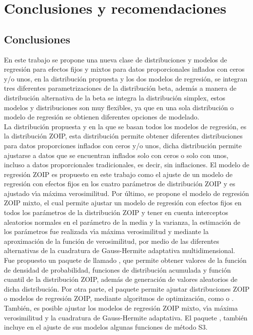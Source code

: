 \chapter{Conclusiones y recomendaciones}\label{cap5}
\section{Conclusiones}

En este trabajo se propone una nueva clase de distribuciones y modelos de regresi\'{o}n para efectos fijos y mixtos para datos proporcionales inflados con ceros y/o unos, en la distribuci\'{o}n propuesta y los dos modelos de regresi\'{o}n, se integran tres diferentes parametrizaciones de la distribuci\'{o}n beta, adem\'{a}s a manera de distribuci\'{o}n alternativa de la beta se integra la distribuci\'{o}n simplex, estos modelos y distribuciones son muy flexibles, ya que en una sola distribuci\'{o}n o modelo de regresi\'{o}n se obtienen diferentes opciones de modelado.\\

La distribuci\'{o}n propuesta y en la que se basan todos los modelos de regresi\'{o}n, es la distribuci\'{o}n ZOIP, esta distribuci\'{o}n permite obtener diferentes distribuciones para datos proporciones inflados con ceros y/o unos, dicha distribuci\'{o}n permite ajustarse a datos que se encuentran inflados solo con ceros o solo con unos, incluso a datos proporcionales tradicionales, es decir, sin inflaciones. El modelo de regresi\'{o}n ZOIP es propuesto en este trabajo como el ajuste de un modelo de regresi\'{o}n con efectos fijos en los cuatro par\'{a}metros de distribuci\'{o}n ZOIP y es ajustado v\'{\i}a m\'{a}xima verosimilitud. Por \'{u}ltimo, se propone el modelo de regresi\'{o}n ZOIP mixto, el cual permite ajustar un modelo de regresi\'{o}n con efectos fijos en todos los par\'{a}metros de la distribuci\'{o}n ZOIP y tener en cuenta interceptos aleatorios normales en el par\'{a}metro de la media y la varianza, la estimaci\'{o}n de los par\'{a}metros fue realizada v\'{\i}a m\'{a}xima verosimilitud y mediante la aproximaci\'{o}n de la funci\'{o}n de verosimilitud, por medio de las diferentes alternativas de la cuadratura de Gauss-Hermite adaptativa multidimensional.\\
 
Fue propuesto un paquete de  llamado , que permite obtener valores de la funci\'{o}n de densidad de probabilidad, funciones de distribuci\'{o}n acumulada y funci\'{o}n cuantil de la distribuci\'{o}n ZOIP, adem\'{a}s de generaci\'{o}n de valores aleatorios de dicha distribuci\'{o}n. Por otra parte, el paquete permite ajustar distribuciones ZOIP o modelos de regresi\'{o}n ZOIP, mediante algoritmos de optimizaci\'{o}n, como  o . Tambi\'{e}n, es posible ajustar los modelos de regresi\'{o}n ZOIP mixto, v\'{\i}a m\'{a}xima verosimilitud y la cuadratura de Gauss-Hermite adaptativa. El paquete , tambi\'{e}n incluye en el ajuste de sus modelos algunas funciones de m\'{e}todo S3.\\

